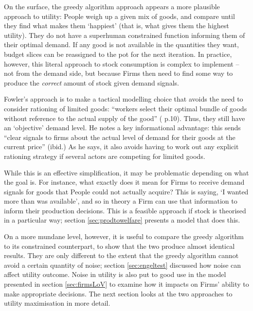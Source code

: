 On the surface, the greedy algorithm approach appears a more plausible approach to utility: People weigh up a given mix of goods, and compare until they find what makes them `happiest’ (that is, what gives them the highest utility). They do not have a superhuman constrained function informing them of their optimal demand. If any good is not available in the quantities they want, budget slices can be reassigned to the pot for the next iteration. In practice, however, this literal approach to stock consumption is complex to implement – not from the demand side, but because Firms then need to find some way to produce the \emph{correct} amount of stock given demand signals.

Fowler's approach is to make a tactical modelling choice that avoids the need to consider rationing of limited goods: ``workers select their optimal bundle of goods without reference to the actual supply of the good'' (\citealt{fowler_finding_2011} p.10). Thus, they still have an `objective' demand level. He notes a key informational advantage: this sends ``clear signals to firms about the actual level of demand for their goods at the current price'' (ibid.) As he says, it also avoids having to work out any explicit rationing strategy if several actors are competing for limited goods. 

While this is an effective simplification, it may be problematic depending on what the goal is. For instance, what exactly does it mean for Firms to receive demand signals for goods that People could not actually acquire? This is saying, `I wanted more than was available’, and so in theory a Firm can use that information to inform their production decisions. This is a feasible approach if stock is theorised in a particular way; section \ref{sec:prodtowelfare} presents a model that does this.

On a more mundane level, however, it is useful to compare the greedy algorithm to its constrained counterpart, to show that the two produce almost identical results. They are only different to the extent that the greedy algorithm cannot avoid a certain quantity of noise; section \ref{sec:engeltest} discussed how noise can affect utility outcome. Noise in utility is also put to good use in the model presented in section \ref{sec:firmsLoV} to examine how it impacts on Firms’ ability to make appropriate decisions. The next section looks at the two approaches to utility maximisation in more detail.


